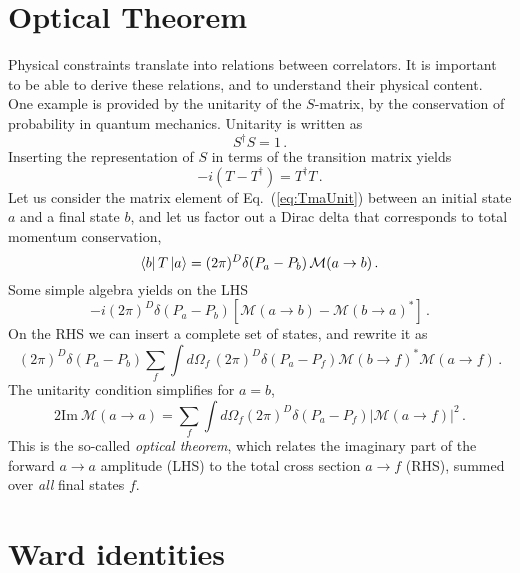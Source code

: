 \documentclass[notes]{subfiles}
\begin{document}
\section{Optical Theorem}
\label{sec:optical-theorem}

Physical constraints translate into relations between correlators. It
is important to be able to derive these relations, and to understand
their physical content. One example is provided by the unitarity of
the $S$-matrix, \ie by the conservation of probability in quantum
mechanics. Unitarity is written as
\begin{equation}
  \label{eq:SmatUnit}
  S^\dagger S = 1\, .
\end{equation}
Inserting the representation of $S$ in terms of the transition matrix
yields
\begin{equation}
  \label{eq:TmaUnit}
  -i \left(T - T^\dagger\right) = T^\dagger T\, .
\end{equation}
Let us consider the matrix element of Eq.~(\ref{eq:TmaUnit}) between an
initial state $a$ and a final state $b$, and let us factor out a Dirac
delta that corresponds to total momentum conservation, 
\begin{equation}
  \label{eq:MAmplitude}
  \bra{b} T \ket{a} = (2\pi)^D \delta(P_a - P_b)\, \mathcal{M}(a
  \to b)\, .
\end{equation}
Some simple algebra yields on the LHS
\begin{equation}
  \label{eq:MLHS}
  -i (2\pi)^D \delta\left(P_a-P_b\right) \left[
    \mathcal{M}(a\to b) - \mathcal{M}(b \to a)^*
    \right]\, . 
\end{equation}
On the RHS we can insert a complete set of states, and rewrite it as
\begin{equation}
  \label{eq:MRHS}
   (2\pi)^D \delta\left(P_a-P_b\right) \sum_f \int d\Omega_f\,
   (2\pi)^D \delta\left(P_a-P_f\right) \mathcal{M}(b\to f)^*
   \mathcal{M}(a\to f)\, .
 \end{equation}
The unitarity condition simplifies for $a=b$, 
\begin{equation}
  \label{eq:OptThm}
  2 \mathrm{Im}\ \mathcal{M}(a\to a) = 
  \sum_f \int d\Omega_f  (2\pi)^D \delta\left(P_a-P_f\right) 
  \left|
    \mathcal{M}(a\to f)
  \right|^2\, .
\end{equation}
This is the so-called \emph{optical theorem}, which relates the
imaginary part of the forward $a\to a$ amplitude (LHS) to the total cross
section $a\to f$ (RHS), summed over \emph{all} final states $f$.

\section{Ward identities}
\label{sec:ward-identities}
\end{document}
